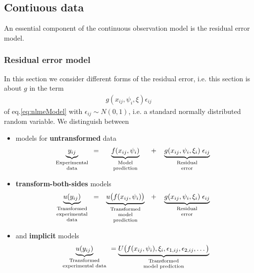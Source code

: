 \subsection{Contiuous data}
\label{subsec:ContinuesData}

An essential component of the continuous observation model is the residual error model.

\subsubsection{Residual error model}
\label{sec:residualErrorModel}
\label{maths:error_model}
\label{maths:combined-err-model}
In this section we consider different forms of the residual error, i.e. this section is about $g$ in the term
\begin{align*}
g(x_{ij}, \psi_{i}, \xi) \epsilon_{ij}
\end{align*}
of eq.\ref{eq:nlmeModel} with $\epsilon_{ij} \sim N(0, 1)$, i.e. a standard normally distributed random variable. We distinguish between
\begin{itemize}\addtolength{\itemsep}{-.95\baselineskip}
\item
models for \textbf{untransformed} data
\begin{align*}
 \underbrace{ y_{ij}}_{\text{\parbox{2cm}{\centering Experimental \\[-4pt]  data}}} =
 \underbrace{ f(x_{ij}, \psi_{i})}_{\text{\parbox{2.5cm}{\centering Model \\[-4pt]  prediction}}} +
 \underbrace{ g(x_{ij}, \psi_{i}, \xi_i) \; \epsilon_{ij}}_{\text{\parbox{3cm}{\centering Residual \\[-4pt] error}}}
 \end{align*}
 \item
\textbf{transform-both-sides} models
\begin{eqnarray}
 \underbrace{ u(y_{ij})}_{\text{\parbox{2cm}{\centering Transformed \\[-4pt] experimental \\[-4pt]  data}}} =
 \underbrace{ u\big(f(x_{ij}, \psi_{i})\big)}_{\text{\parbox{2.5cm}{\centering Transformed \\[-4pt]  model \\[-4pt]  prediction}}} +
 \underbrace{ g(x_{ij}, \psi_{i}, \xi_i) \; \epsilon_{ij}}_{\text{\parbox{3cm}{\centering Residual \\[-4pt] error}}} \nonumber
 \end{eqnarray}
 \item
and \textbf{implicit} models
\begin{eqnarray}
 \underbrace{ u(y_{ij})}_{\text{\parbox{2.5cm}{\centering Transformed \\[-4pt] experimental  data}}} =
 \underbrace{ U\big(f(x_{ij}, \psi_{i}),\xi_i, \epsilon_{1,ij}, \epsilon_{2,ij}, \dots\big)}_{\text{\parbox{2.5cm}{\centering Transformed \\[-4pt]  model prediction}}} \nonumber
 \end{eqnarray}
\end{itemize}
